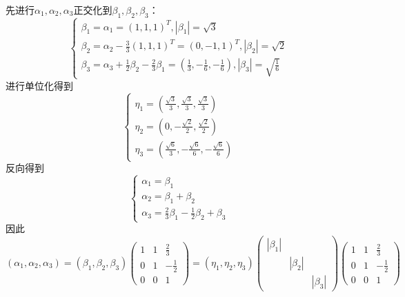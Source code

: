 \begin{solution}
  先进行$\alpha_1,\alpha_2,\alpha_3$正交化到$\beta_1,\beta_2,\beta_3$：
  \begin{equation*}
    \begin{cases}
      \beta_1 = \alpha_1 = (1,1,1)^T, |\beta_1| = \sqrt{3}\\
      \beta_2 = \alpha_2 - \frac{3}{3} (1,1,1)^T = (0,-1,1)^T, |\beta_2| = \sqrt{2}\\
      \beta_3 = \alpha_3 +  \frac{1}{2}\beta_2 - \frac{2}{3}\beta_1 = (\frac{1}{3}, -\frac{1}{6}, - \frac{1}{6}), |\beta_3| = \sqrt{\frac{1}{6}}
    \end{cases}
  \end{equation*}
  进行单位化得到
    \begin{equation*}
      \begin{cases}
        \eta_1 = (\frac{\sqrt{3}}{3}, \frac{\sqrt{3}}{3}, \frac{\sqrt{3}}{3})\\
        \eta_2 = (0, - \frac{\sqrt{2}}{2}, \frac{\sqrt{2}}{2})\\
        \eta_3 = (\frac{\sqrt{6}}{3}, - \frac{\sqrt{6}}{6}, - \frac{\sqrt{6}}{6})
      \end{cases}
    \end{equation*}
    反向得到
    \begin{equation*}
      \begin{cases}
        \alpha_1 = \beta_1\\
        \alpha_2 = \beta_1 + \beta_2\\
        \alpha_3 = \frac{2}{3}\beta_1 - \frac{1}{2}\beta_2 + \beta_3
      \end{cases}
    \end{equation*}
    因此
    \begin{equation*}
      (\alpha_1,\alpha_2,\alpha_3) = (\beta_1,\beta_2,\beta_3) \left(
        \begin{array}{ccc}
          1&1&\frac{2}{3} \\
           0&1&- \frac{1}{2} \\
           0&0&1
        \end{array}
      \right) = (\eta_1,\eta_2,\eta_3) \left(
        \begin{array}{ccc}
          |\beta_1|&& \\
                   &|\beta_2|& \\
                   &&|\beta_3|
        \end{array}
      \right) \left(
        \begin{array}{ccc}
          1&1&\frac{2}{3} \\
           0&1&- \frac{1}{2} \\
           0&0&1
        \end{array}
      \right)
    \end{equation*}
\end{solution}


